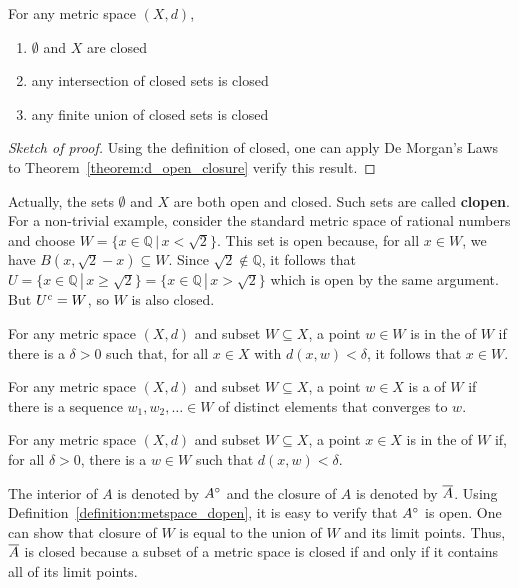 \begin{corollary}
For any metric space $(X,d)$,
\begin{enumerate}
\item $\emptyset$ and $X$ are closed
\item any intersection of closed sets is closed
\item any finite union of closed sets is closed
\end{enumerate}
\end{corollary}
\begin{proof}[Sketch of proof]
Using the definition of closed, one can apply De Morgan's Laws to Theorem~\ref{theorem:d_open_closure} verify this result.
\end{proof}

Actually, the sets $\emptyset$ and $X$ are both open and closed.
Such sets are called \textbf{clopen}.
For a non-trivial example, consider the standard metric space of rational numbers and choose $W = \{x\in \mathbb{Q}\,|\, x< \sqrt{2}\}$.
This set is open because, for all $x\in W$, we have $B(x,\sqrt{2}-x)\subseteq W$.
Since $\sqrt{2}\notin \mathbb{Q}$, it follows that $U = \{x\in \mathbb{Q}\,|\, x\geq \sqrt{2}\}=\{x\in \mathbb{Q}\,|\, x> \sqrt{2}\}$ which is open by the same argument.
But ${U}^{c} = W$, so $W$ is also closed.


\begin{definition}
For any metric space $(X,d)$ and subset $W \subseteq X$, a point $w\in W$ is in the  of $W$ if there is a $\delta >0$ such that, for all $x\in X$ with $d(x,w)<\delta$, it follows that $x\in W$.
\end{definition}

\begin{definition}
For any metric space $(X,d)$ and subset $W \subseteq X$, a point $w\in X$ is a  of $W$ if there is a sequence $w_1,w_2,\ldots\in W$ of distinct elements that converges to $w$.
\end{definition}

\begin{definition}
For any metric space $(X,d)$ and subset $W \subseteq X$, a point $x\in X$ is in the  of $W$ if, for all $\delta >0$, there is a $w\in W$ such that $d(x,w)<\delta$.
\end{definition}

The interior of $A$ is denoted by ${A}^{\circ}$ and the closure of $A$ is denoted by $\overline{A}$.
Using Definition~\ref{definition:metspace_dopen}, it is easy to verify that ${A}^{\circ}$ is open.
One can show that closure of $W$ is equal to the union of $W$ and its limit points.
Thus, $\overline{A}$ is closed because a subset of a metric space is closed if and only if it contains all of its limit points.

